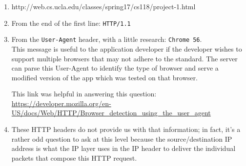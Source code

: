 \documentclass{report}
\begin{document}
\begin{problem}
\begin{answer}{30em}
  \begin{enumerate}
  \item http://web.cs.ucla.edu/classes/spring17/cs118/project-1.html
  \item From the end of the first line: \texttt{HTTP/1.1}
  \item From the \texttt{User-Agent} header, with a little research:
        \texttt{Chrome 56}.\\
        This message is useful to the application developer if the developer
        wishes to support multiple browsers that may not adhere to the
        standard. The server can parse this User-Agent to identify the
        type of browser and serve a modified version of the app which was
        tested on that browser.

        This link was helpful in answering this question:\\
        \url{https://developer.mozilla.org/en-US/docs/Web/HTTP/Browser_detection_using_the_user_agent}
  \item These HTTP headers do not provide us with that information; in fact,
        it's a rather odd question to ask at this level because the
        source/destination IP address is what the IP layer uses in the IP
        header to deliver the individual packets that compose this HTTP
        request.
  \end{enumerate}
\end{answer}
\end{problem}
\end{document}
